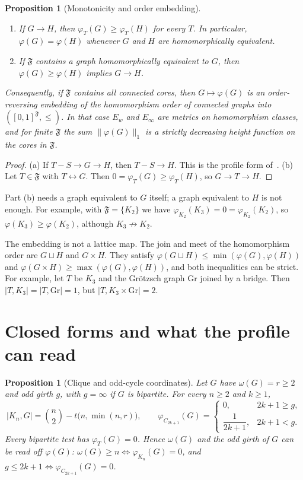 \documentclass{article}
\newtheorem{proposition}[theorem]{Proposition}
\begin{document}
\begin{proposition}[Monotonicity and order embedding]
\label{prop:profile_order}
\begin{enumerate}
\item[(a)] If $G\to H$, then $\varphi_T(G)\ge\varphi_T(H)$ for every $T$.
      In particular, $\varphi(G)=\varphi(H)$ whenever $G$ and $H$ are
      homomorphically equivalent.
\item[(b)] If $\mathfrak F$ contains a graph homomorphically equivalent to
      $G$, then $\varphi(G)\ge\varphi(H)$ implies $G\to H$.
\end{enumerate}
Consequently, if $\mathfrak F$ contains all connected cores, then
$G\mapsto\varphi(G)$ is an order-reversing embedding of the homomorphism
order of connected graphs into $([0,1]^{\mathfrak F},\le)$.  In that case
$E_w$ and $E_\infty$ are metrics on homomorphism classes, and for finite
$\mathfrak F$ the sum $\|\varphi(G)\|_1$ is a strictly decreasing height
function on the cores in $\mathfrak F$.
\end{proposition}

\begin{proof}
(a) If $T-S\to G\to H$, then $T-S\to H$.  This is the profile form
of~\cite[Lemma~2.6]{efjt2015}.
(b) Let $T\in\mathfrak F$ with $T\leftrightarrow G$.  Then
$0=\varphi_T(G)\ge\varphi_T(H)$, so $G\to T\to H$.
\end{proof}

Part (b) needs a graph equivalent to $G$ itself; a graph equivalent to $H$
is not enough.  For example, with $\mathfrak F=\{K_2\}$ we have
$\varphi_{K_2}(K_3)=0=\varphi_{K_2}(K_2)$, so $\varphi(K_3)\ge\varphi(K_2)$,
although $K_3\not\to K_2$.

The embedding is not a lattice map.  The join and meet of the homomorphism
order are $G\sqcup H$ and $G\times H$.  They satisfy
$\varphi(G\sqcup H)\le\min(\varphi(G),\varphi(H))$ and
$\varphi(G\times H)\ge\max(\varphi(G),\varphi(H))$, and both inequalities
can be strict.  For example, let $T$ be $K_3$ and the Gr\"otzsch graph
$\mathrm{Gr}$ joined by a bridge.  Then $|T,K_3|=|T,\mathrm{Gr}|=1$, but
$|T,K_3\times\mathrm{Gr}|=2$.

\section{Closed forms and what the profile can read}

\begin{proposition}[Clique and odd-cycle coordinates]
\label{prop:profile_closed}
Let $G$ have $\omega(G)=r\ge2$ and odd girth $g$, with $g=\infty$ if $G$ is
bipartite.  For every $n\ge2$ and $k\ge1$,
\[
  |K_n,G|=\binom n2-t\bigl(n,\min(n,r)\bigr),\qquad
  \varphi_{C_{2k+1}}(G)=
  \begin{cases}0,&2k+1\ge g,\\[2pt] \dfrac1{2k+1},&2k+1<g.\end{cases}
\]
Every bipartite test has $\varphi_T(G)=0$.  Hence $\omega(G)$ and the odd
girth of $G$ can be read off $\varphi(G)$:
$\omega(G)\ge n\iff\varphi_{K_n}(G)=0$, and
$g\le 2k+1\iff\varphi_{C_{2k+1}}(G)=0$.
\end{proposition}
\end{document}
